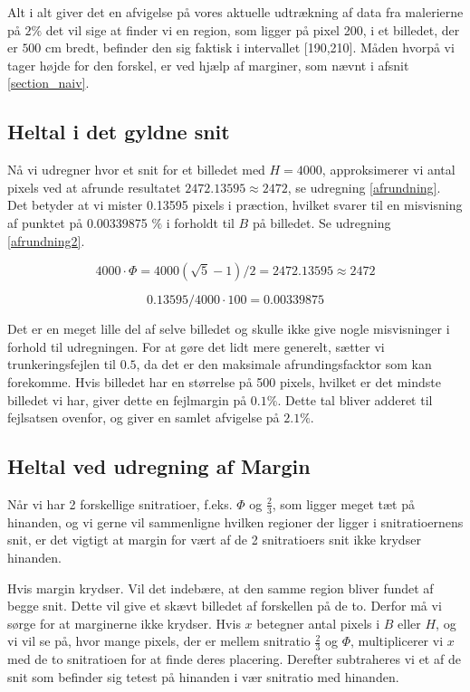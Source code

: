 Alt i alt giver det en afvigelse på vores aktuelle udtrækning af data
fra malerierne på $2\%$ det vil sige at finder vi en region, som ligger
på pixel 200, i et billedet, der er $500$ cm bredt, befinder den sig
faktisk i intervallet [190,210]. Måden hvorpå vi tager højde for den
forskel, er ved hjælp af marginer, som nævnt i afsnit
\ref{section_naiv}.


\subsection{Heltal i det gyldne snit}
Nå vi udregner hvor et snit for et billedet med $H = 4000$,
approksimerer vi antal pixels ved at afrunde resultatet $2472.13595
\approx 2472$, se udregning \ref{afrundning}. Det betyder at vi mister
0.13595 pixels i præction, hvilket svarer til en misvisning af punktet
på 0.00339875 $\%$ i forholdt til $B$ på billedet. Se udregning
\ref{afrundning2}.

\begin{equation}
	4000 \cdot \varPhi = 4000(\sqrt{5}-1)/2 = 2472.13595 \approx 2472 \label{afrundning}
\end{equation}

\begin{equation}
	0.13595/4000 \cdot 100 = 0.00339875 \label{afrundning2}
\end{equation}

Det er en meget lille del af selve billedet og skulle ikke give nogle
misvisninger i forhold til udregningen. For at gøre det lidt mere
generelt, sætter vi trunkeringsfejlen til $0.5$, da det er den maksimale
afrundingsfacktor som kan forekomme. Hvis billedet har en størrelse på
500 pixels, hvilket er det mindste billedet vi har, giver dette en fejlmargin
på $0.1 \%$. Dette tal bliver adderet til fejlsatsen ovenfor, og giver
en samlet afvigelse på $2.1\%$.



\subsection{Heltal ved udregning af Margin}
Når vi har 2 forskellige snitratioer, f.eks. $\varPhi$ og $\frac{2}{3}$,
som ligger meget tæt på hinanden, og vi gerne vil sammenligne hvilken
regioner der ligger i snitratioernens snit, er det vigtigt at margin for
vært af de 2 snitratioers snit ikke krydser hinanden. 

Hvis margin krydser. Vil det indebære, at den samme region bliver fundet
af begge snit. Dette vil give et skævt billedet af forskellen på de to.
Derfor må vi sørge for at marginerne ikke krydser. Hvis $x$ betegner
antal pixels i $B$ eller $H$, og vi vil se på, hvor mange pixels, der er
mellem snitratio $\frac{2}{3}$ og $\varPhi$, multiplicerer vi $x$ med de
to snitratioen for at finde deres placering. Derefter subtraheres vi et
af de snit som befinder sig tetest på hinanden i vær snitratio med
hinanden.


